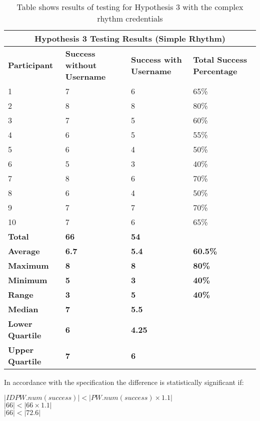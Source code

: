 \documentclass{article}
\begin{document}
{
\begin{table} [H]
\centering
\begin{tabular}{ |p{2cm}|p{4cm}|p{4cm}| p{4cm} | }
\hline
\multicolumn{4}{|c|}{\textbf{Hypothesis 3 Testing Results (Simple Rhythm)}} \\
\hline
\textbf{Participant} & \textbf{Success without Username} & \textbf{Success with Username} & \textbf{Total Success Percentage} \\
\hline
1 & 7 & 6 & 65\% \\
\hline
2 & 8 & 8 & 80\% \\
\hline
3 & 7 & 5 & 60\% \\
\hline
4 & 6 & 5 & 55\%  \\
\hline
5 & 6 & 4 & 50\% \\
\hline
6 & 5 & 3 & 40\% \\
\hline
7 & 8 & 6 & 70\% \\
\hline
8 & 6 & 4 & 50\% \\
\hline
9 & 7 & 7 & 70\% \\
\hline
10 & 7 & 6 & 65\% \\
\hline
\textbf{Total} & \textbf{66} & \textbf{54} & \\
\hline
\textbf{Average} & \textbf{6.7} & \textbf{5.4} & \textbf{60.5\%} \\
\hline
\textbf{Maximum} & \textbf{8} & \textbf{8} & \textbf{80\%} \\
\hline
\textbf{Minimum} & \textbf{5} & \textbf{3} & \textbf{40\%} \\
\hline
\textbf{Range} & \textbf{3} & \textbf{5} & \textbf{40\%} \\
\hline
\textbf{Median} & \textbf{7} & \textbf{5.5} & \\
\hline
\textbf{Lower Quartile} & \textbf{6} & \textbf{4.25} & \\
\hline
\textbf{Upper Quartile} & \textbf{7} & \textbf{6} & \\
\hline
\end{tabular}
\caption{Table shows results of testing for Hypothesis 3 with the complex rhythm credentials}
\label{table:3}
\end{table}
}

In accordance with the specification the difference is statistically significant if: 
\begin{center}
    $ |IDPW.num(success)| < |PW.num(success) \times 1.1|$ \\
    $ |66| < |66 \times 1.1| $ \\
    $ |66| < |72.6| $
\end{center} 
\end{document}

